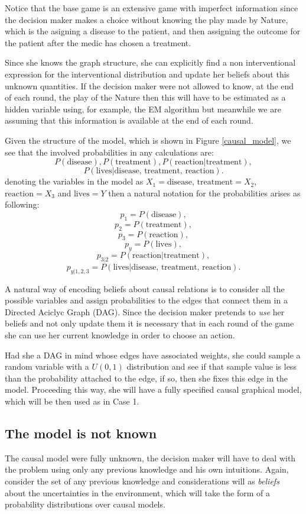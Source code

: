\documentclass{article}
\begin{document}
Notice that the base game is an extensive game with imperfect information since the decision maker makes a choice without knowing the play made by Nature, which is the asigning a disease to the patient, and then assigning the outcome for the patient after the medic has chosen a treatment. 

Since she knows the graph structure, she can explicitly find a non interventional expression for the interventional distribution and update her beliefs about this unknown quantities. If the decision maker were not allowed to know, at the end of each round, the play of the Nature then this will have to be estimated as a hidden variable using, for example, the EM algorithm \cite{dempster1977maximum} but meanwhile we are assuming that this information is available at the end of each round.

Given the structure of the model, which is shown in Figure \ref{causal_model}, we see that the involved probabilities in any calculations are:
\[ P(\textrm{disease}), P(\textrm{treatment}), P(\textrm{reaction} | \textrm{treatment}), \]
\[P(\textrm{lives} | \textrm{disease, treatment, reaction}). \]
denoting the variables in the model as $X_1 = \textrm{disease}$, $\textrm{treatment}=X_2$, $\textrm{reaction}=X_3$ and $\textrm{lives}=Y$ then a natural notation for the probabilities arises as following:
\[ p_1 = P(\textrm{disease}), \]
\[ p_2 = P(\textrm{treatment}), \]
\[ p_3 = P(\textrm{reaction}),\]
\[p_y= P(\textrm{lives}), \]
\[ p_{3 | 2} = P(\textrm{reaction} | \textrm{treatment}), \]
\[p_{y |1,2,3} = P(\textrm{lives} | \textrm{disease, treatment, reaction}). \]

A natural way of encoding beliefs about causal relations is to consider all the possible variables and assign probabilities to the edges that connect them in a Directed Aciclyc Graph (DAG). Since the decision maker pretends to \textit{use} her beliefs and not only update them it is necessary that in each round of the game she can use her current knowledge in order to choose an action.

Had she a DAG in mind whose edges have associated weights, she could sample a random variable with a $U(0,1)$ distribution and see if that sample value is less than the probability attached to the edge, if so, then she fixes this edge in the model. Proceeding this way, she will have a fully specified causal graphical model, which will be then used as in Case 1.

\subsection{The model is not known}
The causal model were fully unknown, the decision maker will have to deal with the problem using only any previous knowledge and his own intuitions. Again, consider the set of any previous knowledge and considerations will as \textit{beliefs} about the uncertainties in the environment, which will take the form of a probability distributions over causal models. 
\end{document}
